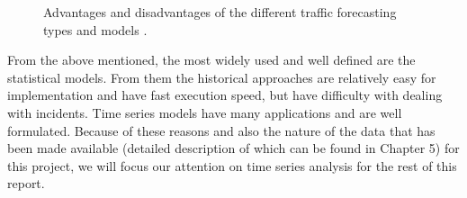 \begin{figure}[ht]
	\caption{Advantages and disadvantages of the different traffic forecasting types and models \cite{youKim}.}
	\label{fig:modelsProsCons}
\end{figure}

From the above mentioned, the most widely used and well defined are the statistical models. From them the historical approaches are relatively easy for implementation and have fast execution speed, but have difficulty with dealing with incidents. Time series models have many applications and are well formulated. Because of these reasons and also the nature of the data that has been made available (detailed description of which can be found in Chapter 5) for this project, we will focus our attention on time series analysis for the rest of this report.

